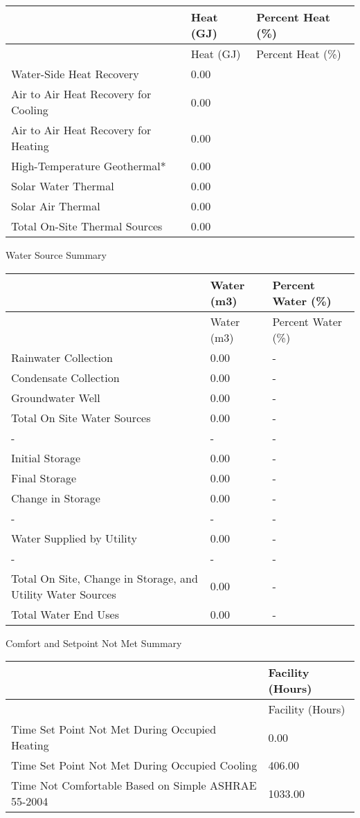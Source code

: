 \begin{longtable}[c]{@{}lll@{}}
\toprule 
~ & Heat (GJ) & Percent Heat (\%) \tabularnewline
\midrule
\endfirsthead

\toprule 
~ & Heat (GJ) & Percent Heat (\%) \tabularnewline
\midrule
\endhead

Water-Side Heat Recovery & 0.00 & ~ \tabularnewline
Air to Air Heat Recovery for Cooling & 0.00 & ~ \tabularnewline
Air to Air Heat Recovery for Heating & 0.00 & ~ \tabularnewline
High-Temperature Geothermal* & 0.00 & ~ \tabularnewline
Solar Water Thermal & 0.00 & ~ \tabularnewline
Solar Air Thermal & 0.00 & ~ \tabularnewline
Total On-Site Thermal Sources & 0.00 & ~ \tabularnewline
\bottomrule
\end{longtable}

Water Source Summary

\begin{longtable}[c]{>{\raggedright}p{3.0in}>{\raggedright}p{1.5in}>{\raggedright}p{1.5in}}
\toprule 
~ & Water (m3) & Percent Water (\%) \tabularnewline
\midrule
\endfirsthead

\toprule 
~ & Water (m3) & Percent Water (\%) \tabularnewline
\midrule
\endhead

Rainwater Collection & 0.00 & - \tabularnewline
Condensate Collection & 0.00 & - \tabularnewline
Groundwater Well & 0.00 & - \tabularnewline
Total On Site Water Sources & 0.00 & - \tabularnewline
- & - & - \tabularnewline
Initial Storage & 0.00 & - \tabularnewline
Final Storage & 0.00 & - \tabularnewline
Change in Storage & 0.00 & - \tabularnewline
- & - & - \tabularnewline
Water Supplied by Utility & 0.00 & - \tabularnewline
- & - & - \tabularnewline
Total On Site, Change in Storage, and Utility Water Sources & 0.00 & - \tabularnewline
Total Water End Uses & 0.00 & - \tabularnewline
\bottomrule
\end{longtable}

Comfort and Setpoint Not Met Summary

\begin{longtable}[c]{>{\raggedright}p{4.5in}>{\raggedright}p{1.5in}}
\toprule 
~ & Facility (Hours) \tabularnewline
\midrule
\endfirsthead

\toprule 
~ & Facility (Hours) \tabularnewline
\midrule
\endhead

Time Set Point Not Met During Occupied Heating & 0.00 \tabularnewline
Time Set Point Not Met During Occupied Cooling & 406.00 \tabularnewline
Time Not Comfortable Based on Simple ASHRAE 55-2004 & 1033.00 \tabularnewline
\bottomrule
\end{longtable}

